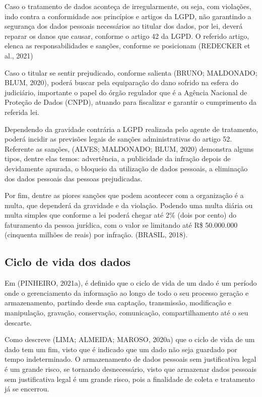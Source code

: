 \documentclass[
	12pt,				%
	openright,			%
	oneside,			%
	a4paper,			%
	english,			%
	french,				%
	spanish,			%
	brazil,				%
	]{abntex2}
\begin{document}
Caso o tratamento de dados aconteça de irregularmente, ou seja, com violações, indo contra a conformidade aos princípios e artigos da LGPD, não garantindo a segurança dos dados pessoais necessários ao titular dos dados, por lei, deverá reparar os danos que causar, conforme o artigo 42 da LGPD. O referido artigo, elenca as responsabilidades e sanções, conforme se posicionam (REDECKER et al., 2021) 

Caso o titular se sentir prejudicado, conforme salienta (BRUNO; MALDONADO; BLUM, 2020), poderá buscar pela equiparação do dano sofrido na esfera do judiciário, importante o papel do órgão regulador que é a Agência Nacional de Proteção de Dados (CNPD), atuando para fiscalizar e garantir o cumprimento da referida lei.

Dependendo da gravidade contrária a LGPD realizada pelo agente de tratamento, poderá incidir as previsões legais de sanções administrativas do artigo 52. Referente as sanções, (ALVES; MALDONADO; BLUM, 2020) demonstra alguns tipos, dentre elas temos: advertência, a publicidade da infração depois de devidamente apurada, o bloqueio da utilização de dados pessoais, a eliminação dos dados pessoais das pessoas prejudicadas. 

Por fim, dentre as piores sanções que podem acontecer com a organização é a multa, que dependerá da gravidade e da violação. Podendo uma multa diária ou multa simples que conforme a lei poderá chegar até 2\% (dois por cento) do faturamento da pessoa jurídica, com o valor se limitando até R\$ 50.000.000 (cinquenta milhões de reais) por infração. (BRASIL, 2018).

\subsection{Ciclo de vida dos dados}

Em (PINHEIRO, 2021a), é definido que o ciclo de vida de um dado é um período onde o gerenciamento da informação ao longo de todo o seu processo geração e armazenamento, partindo desde sua captação, transmissão, modificação e manipulação, gravação, conservação, comunicação, compartilhamento até o seu descarte.

Como descreve (LIMA; ALMEIDA; MAROSO, 2020a) que o ciclo de vida de um dado tem um fim, visto que é indicado que um dado não seja guardado por tempo indeterminado. O armazenamento de dados pessoais sem justificativa legal é um grande risco, se tornando desnecessário, visto que armazenar dados pessoais sem justificativa legal é um grande risco, pois a finalidade de coleta e tratamento já se encerrou.
\end{document}
